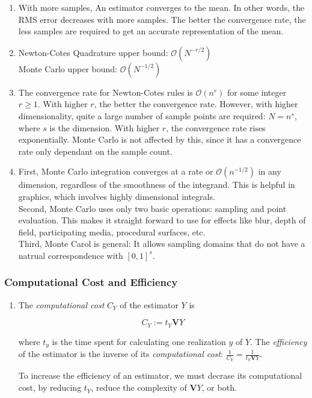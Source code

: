 \begin{enumerate}
\item
With more samples, An estimator converges to the mean. In other words, the RMS error decreases with more samples. The better the convergence rate, the less samples are required to get an accurate representation of the mean. 

\item
Newton-Cotes Quadrature upper bound: $\mathcal O(N^{-r/2})$ \\
Monte Carlo upper bound: $\mathcal O(N^{-1/2})$

\item
The convergence rate for Newton-Cotes rules is $\mathcal O(n^r)$ for some integer $r \ge 1$. With higher $r$, the better the convergence rate. However, with higher dimensionality, quite a large number of sample points are required: $N = n^s$, where $s$ is the dimension. With higher $r$, the convergence rate rises exponentially. Monte Carlo is not affected by this, since it has a convergence rate only dependant on the sample count. 

\item
First, Monte Carlo integration converges at a rate or $\mathcal O(n^{-1/2})$ in any dimension, regardless of the smoothness of the integrand. This is helpful in graphics, which involves highly dimensional integrals. \\
Second, Monte Carlo uses only two basic operations: sampling and point evaluation. This makes it straight forward to use for effects like blur, depth of field, participating media, procedural surfaces, etc. \\
Third, Monte Carol is general: It allows sampling domains that do not have a natrual correspondence with $[0, 1]^s$.   
\end{enumerate}

\subsubsection{Computational Cost and Efficiency}

\begin{enumerate}
\item
The \textit{computational cost} $C_Y$ of the estimator $Y$ is 

\[C_Y := t_Y \textbf{V}Y\]

where $t_y$ is the time spent for calculating one realization $y$ of $Y$. The \textit{efficiency} of the estimator is the inverse of its \textit{computational cost}: $\frac{1}{C_Y} = \frac{1}{t_Y \textbf{V}Y}$.

To increase the efficiency of an estimator, we must decrase its computational cost, by reducing $t_Y$, reduce the complexity of $\textbf{V}Y$, or both.
\end{enumerate}

